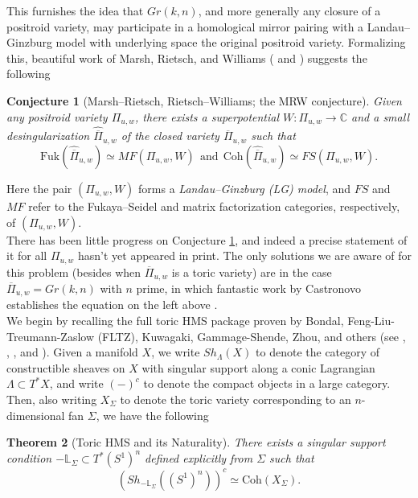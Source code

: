 \documentclass[11pt]{amsart}
\newtheorem{thm}{Theorem}[section]
\newtheorem{conj}[thm]{Conjecture}
\theoremstyle{definition}
\theoremstyle{remark}
\newcommand{\Coh}{\mathrm{Coh}}
\newcommand{\Fuk}{\mathrm{Fuk}}
\numberwithin{equation}{section}
\begin{document}
This furnishes the idea that $Gr(k,n)$, and more generally any closure of a positroid variety, may participate in a homological mirror pairing with a Landau--Ginzburg model with underlying space the original positroid variety. Formalizing this, beautiful work of Marsh, Rietsch, and Williams (\cite{MR} and \cite{RW}) suggests the following

\begin{conj}[Marsh--Rietsch, Rietsch--Williams; the MRW conjecture]\label{MRW}
Given any positroid variety $\Pi_{u,w}$, there exists a superpotential $W: \Pi_{u,w} \rightarrow \mathbb{C}$ and a small desingularization $\widehat{\overline{\Pi}}_{u,w}$ of the closed variety $\overline{\Pi}_{u,w}$ such that
$$\Fuk(\widehat{\overline{\Pi}}_{u,w}) \simeq MF(\Pi_{u,w}, W)\:\:\text{and}\:\:\Coh(\widehat{\overline{\Pi}}_{u,w}) \simeq FS(\Pi_{u,w}, W).$$
\end{conj}

\noindent Here the pair $(\Pi_{u,w}, W)$ forms a \textit{Landau--Ginzburg (LG) model}, and $FS$ and $MF$ refer to the Fukaya--Seidel and matrix factorization categories, respectively, of $(\Pi_{u,w}, W)$.\\

There has been little progress on Conjecture \ref{MRW}, and indeed a precise statement of it for all $\Pi_{u,w}$ hasn't yet appeared in print. The only solutions we are aware of for this problem (besides when $\overline{\Pi}_{u,w}$ is a toric variety) are in the case $\overline{\Pi}_{u,w} = Gr(k,n)$ with $n$ prime, in which fantastic work by Castronovo establishes the equation on the left above \cite{castronovo2020fukaya}.\\

We begin by recalling the full toric HMS package proven by Bondal, Feng-Liu-Treumann-Zaslow (FLTZ), Kuwagaki, Gammage-Shende, Zhou, and others (see \cite{FLTZ}, \cite{Kuwagaki}, \cite{gammage2022mirror}, and \cite{zhou2019twisted}). Given a manifold $X$, we write $Sh_\Lambda(X)$ to denote the category of constructible sheaves on $X$ with singular support along a conic Lagrangian $\Lambda \subset T^*X$, and write $(-)^c$ to denote the compact objects in a large category. Then, also writing $X_\Sigma$ to denote the toric variety corresponding to an $n$-dimensional fan $\Sigma$, we have the following

\begin{thm}[Toric HMS and its Naturality]\label{Toric HMS} There exists a singular support condition $-\mathbb{L}_\Sigma \subset T^*(S^1)^n$ defined explicitly from $\Sigma$ such that
$$(Sh_{-\mathbb{L}_\Sigma}((S^1)^n))^c \simeq \Coh(X_\Sigma).$$
\end{thm}
\end{document}
